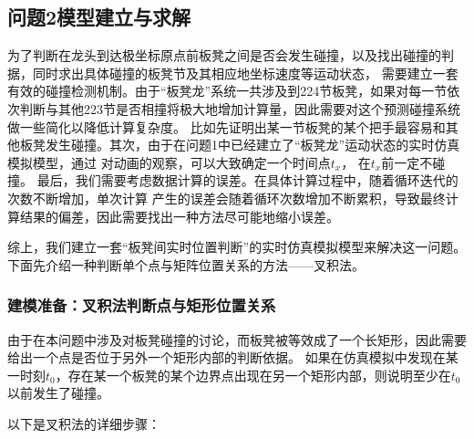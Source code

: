 \documentclass{cumcmthesis1}
\begin{document}
\subsection{\textbf{问题2}模型建立与求解}
\par 
为了判断在龙头到达极坐标原点前板凳之间是否会发生碰撞，以及找出碰撞的判据，同时求出具体碰撞的板凳节及其相应地坐标速度等运动状态，
需要建立一套有效的碰撞检测机制。由于“板凳龙”系统一共涉及到224节板凳，如果对每一节依次判断与其他223节是否相撞将极大地增加计算量，因此需要对这个预测碰撞系统做一些简化以降低计算复杂度。
比如先证明出某一节板凳的某个把手最容易和其他板凳发生碰撞。其次，由于在问题1中已经建立了“板凳龙”运动状态的实时仿真模拟模型，通过
对动画的观察，可以大致确定一个时间点$t_x$，
在$t_x$前一定不碰撞。
最后，我们需要考虑数据计算的误差。在具体计算过程中，随着循环迭代的次数不断增加，单次计算
产生的误差会随着循环次数增加不断累积，导致最终计算结果的偏差，因此需要找出一种方法尽可能地缩小误差。
\par
综上，我们建立一套“板凳间实时位置判断”的实时仿真模拟模型来解决这一问题。下面先介绍一种判断单个点与矩阵位置关系的方法——叉积法。

\subsubsection{建模准备：叉积法判断点与矩形位置关系}
由于在本问题中涉及对板凳碰撞的讨论，而板凳被等效成了一个长矩形，因此需要给出一个点是否位于另外一个矩形内部的判断依据。
如果在仿真模拟中发现在某一时刻$t_0$，存在某一个板凳的某个边界点出现在另一个矩形内部，则说明至少在$t_0$以前发生了碰撞。
\par
以下是叉积法的详细步骤：
\end{document}

